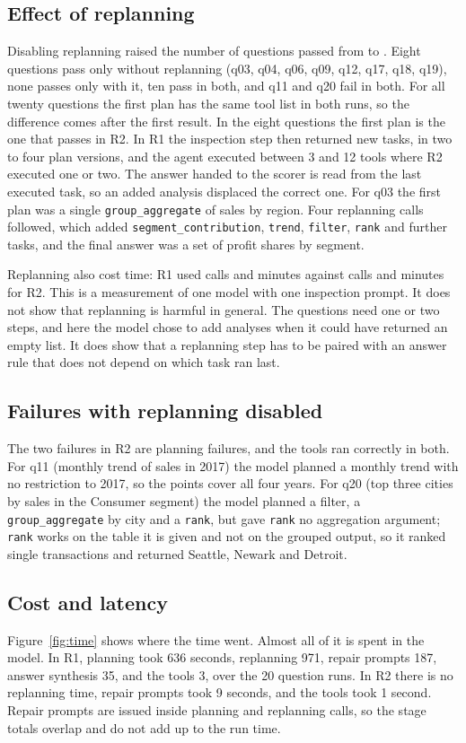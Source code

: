 \subsection{Effect of replanning}
Disabling replanning raised the number of questions passed from \MainQ{} to \NoRepQ{}. Eight questions pass only without replanning (q03, q04, q06, q09, q12, q17, q18, q19), none passes only with it, ten pass in both, and q11 and q20 fail in both. For all twenty questions the first plan has the same tool list in both runs, so the difference comes after the first result. In the eight questions the first plan is the one that passes in R2. In R1 the inspection step then returned new tasks, in two to four plan versions, and the agent executed between 3 and 12 tools where R2 executed one or two. The answer handed to the scorer is read from the last executed task, so an added analysis displaced the correct one. For q03 the first plan was a single \texttt{group\_aggregate} of sales by region. Four replanning calls followed, which added \texttt{segment\_contribution}, \texttt{trend}, \texttt{filter}, \texttt{rank} and further tasks, and the final answer was a set of profit shares by segment.

Replanning also cost time: R1 used \MainCalls{} calls and \MainMinutes{} minutes against \NoRepCalls{} calls and \NoRepMinutes{} minutes for R2. This is a measurement of one model with one inspection prompt. It does not show that replanning is harmful in general. The questions need one or two steps, and here the model chose to add analyses when it could have returned an empty list. It does show that a replanning step has to be paired with an answer rule that does not depend on which task ran last.

\subsection{Failures with replanning disabled}
The two failures in R2 are planning failures, and the tools ran correctly in both. For q11 (monthly trend of sales in 2017) the model planned a monthly trend with no restriction to 2017, so the points cover all four years. For q20 (top three cities by sales in the Consumer segment) the model planned a filter, a \texttt{group\_aggregate} by city and a \texttt{rank}, but gave \texttt{rank} no aggregation argument; \texttt{rank} works on the table it is given and not on the grouped output, so it ranked single transactions and returned Seattle, Newark and Detroit.

\subsection{Cost and latency}
Figure~\ref{fig:time} shows where the time went. Almost all of it is spent in the model. In R1, planning took 636 seconds, replanning 971, repair prompts 187, answer synthesis 35, and the tools 3, over the 20 question runs. In R2 there is no replanning time, repair prompts took 9 seconds, and the tools took 1 second. Repair prompts are issued inside planning and replanning calls, so the stage totals overlap and do not add up to the run time.

